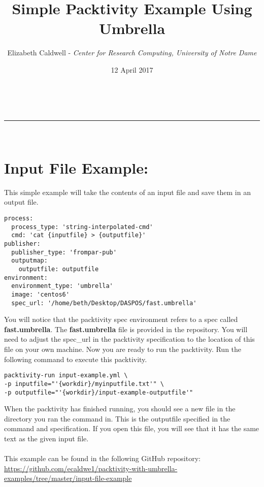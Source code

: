 \documentclass[a4paper,11pt]{article}
\makeatletter
\newcommand{\linia}{\rule{\linewidth}{0.5pt}}
\theoremstyle{mytheor}
\renewcommand{\maketitle}{
\begin{center}
\vspace{2ex}
{\huge \textsc{\@title}}
\vspace{1ex}
\\
\linia\\
\@author \hfill \@date
\vspace{4ex}
\end{center}
}
\makeatother
\begin{document}
\title{Simple Packtivity Example Using Umbrella}

\author{Elizabeth Caldwell - {\it Center for Research Computing, University of Notre Dame}}

\date{12 April 2017}

\maketitle

\section*{Input File Example: }
This simple example will take the contents of an input file and save them in an output file.
\begin{lstlisting}[label={list:first},caption=packtivity specification: inputfile-test.yml]
process:
  process_type: 'string-interpolated-cmd'
  cmd: 'cat {inputfile} > {outputfile}'
publisher:
  publisher_type: 'frompar-pub'
  outputmap:
    outputfile: outputfile
environment:
  environment_type: 'umbrella'
  image: 'centos6'
  spec_url: '/home/beth/Desktop/DASPOS/fast.umbrella'
\end{lstlisting}
You will notice that the packtivity spec environment refers to a spec called {\bf fast.umbrella}. The {\bf fast.umbrella} file is provided in the repository. You will need to adjust the spec\_url in the packtivity specification to the location of this file on your own machine.
Now you are ready to run the packtivity. Run the following command to execute this packtivity.
\begin{lstlisting}[label={list:first},caption=packtivity-run command]
packtivity-run input-example.yml \
-p inputfile="'{workdir}/myinputfile.txt'" \
-p outputfile="'{workdir}/input-example-outputfile'"
\end{lstlisting}
When the packtivity has finished running, you should see a new file in the directory you ran the command in. This is the outputfile specified in the command and specification. If you open this file, you will see that it has the same text as the given input file.
\\\\This example can be found in the following GitHub repository: \\\url{https://github.com/ecaldwe1/packtivity-with-umbrella-examples/tree/master/input-file-example}
\end{document}
